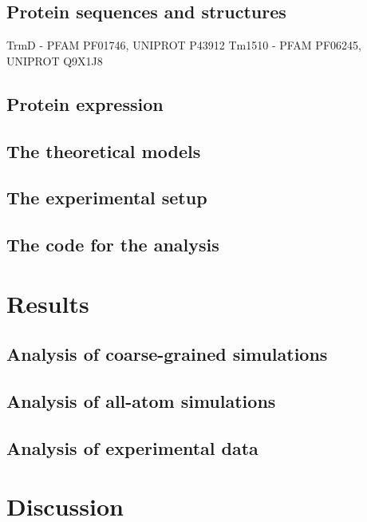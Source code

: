 \documentclass[11pt]{article}
\begin{document}
\subsection{Protein sequences and structures}
\label{subsec:sequences}
TrmD - PFAM PF01746, UNIPROT P43912
Tm1510 - PFAM PF06245, UNIPROT Q9X1J8
\subsection{Protein expression}
\label{subsec:expression}

\subsection{The theoretical models}
\label{subsec:models}

\subsection{The experimental setup}
\label{subsec:experiment}

\subsection{The code for the analysis}
\label{subsec:code}

\section{Results}
\label{sec:results}

\subsection{Analysis of coarse-grained simulations}
\label{subsec:cg}
\subsection{Analysis of all-atom simulations}
\label{subsec:aa}
\subsection{Analysis of experimental data}
\label{subsec:exp}

\section{Discussion}
\label{sec:discussion}

 

\end{document}
